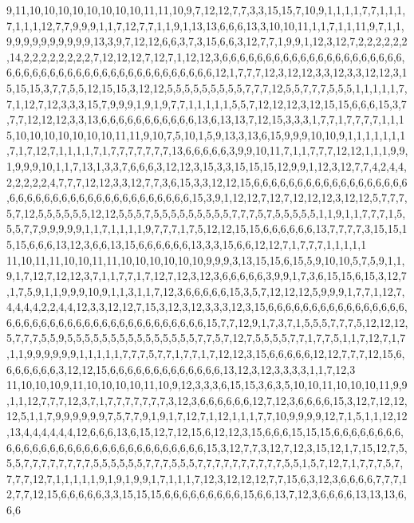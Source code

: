 9,11,10,10,10,10,10,10,10,10,11,11,10,9,7,12,12,7,7,3,3,15,15,7,10,9,1,1,1,1,7,7,1,1,1,7,1,1,1,12,7,7,9,9,9,1,1,7,12,7,7,1,1,9,1,13,13,6,6,6,13,3,10,10,11,1,1,7,1,1,11,9,7,1,1,9,9,9,9,9,9,9,9,9,9,13,3,9,7,12,12,6,6,3,7,3,15,6,6,3,12,7,7,1,9,9,1,12,3,12,7,2,2,2,2,2,2,14,2,2,2,2,2,2,2,2,7,12,12,12,7,12,7,1,12,12,3,6,6,6,6,6,6,6,6,6,6,6,6,6,6,6,6,6,6,6,6,6,6,6,6,6,6,6,6,6,6,6,6,6,6,6,6,6,6,6,6,6,6,6,6,6,12,1,7,7,7,12,3,12,12,3,3,12,3,3,12,12,3,15,15,15,3,7,7,5,5,12,15,15,3,12,12,5,5,5,5,5,5,5,5,5,7,7,7,12,5,5,7,7,7,5,5,5,1,1,1,1,1,7,7,1,12,7,12,3,3,3,15,7,9,9,9,1,9,1,9,7,7,1,1,1,1,1,5,5,7,12,12,12,3,12,15,15,6,6,6,15,3,7,7,7,12,12,12,3,3,13,6,6,6,6,6,6,6,6,6,6,6,13,6,13,13,7,12,15,3,3,3,1,7,7,1,7,7,7,7,1,1,1
5,10,10,10,10,10,10,10,11,11,9,10,7,5,10,1,5,9,13,3,13,6,15,9,9,9,10,10,9,1,1,1,1,1,1,1,7,1,7,12,7,1,1,1,1,7,1,7,7,7,7,7,7,7,13,6,6,6,6,6,3,9,9,10,11,7,1,1,7,7,7,12,12,1,1,1,9,9,1,9,9,9,10,1,1,7,13,1,3,3,7,6,6,6,3,12,12,3,15,3,3,15,15,15,12,9,9,1,12,3,12,7,7,4,2,4,4,2,2,2,2,2,4,7,7,7,12,12,3,3,12,7,7,3,6,15,3,3,12,12,15,6,6,6,6,6,6,6,6,6,6,6,6,6,6,6,6,6,6,6,6,6,6,6,6,6,6,6,6,6,6,6,6,6,6,6,6,6,6,6,15,3,9,1,12,12,7,12,7,12,12,12,3,12,12,5,7,7,7,5,7,12,5,5,5,5,5,5,12,12,5,5,5,7,5,5,5,5,5,5,5,5,5,7,7,7,5,7,5,5,5,5,5,1,1,9,1,1,7,7,7,1,5,5,5,7,7,9,9,9,9,9,1,1,7,1,1,1,1,9,7,7,7,1,7,5,12,12,15,15,6,6,6,6,6,6,13,7,7,7,7,3,15,15,15,15,6,6,6,13,12,3,6,6,13,15,6,6,6,6,6,6,13,3,3,15,6,6,12,12,7,1,7,7,7,1,1,1,1,1
11,10,11,11,10,10,11,11,10,10,10,10,10,10,9,9,9,3,13,15,15,6,15,5,9,10,10,5,7,5,9,1,1,9,1,7,12,7,12,12,3,7,1,1,7,7,1,7,12,7,12,3,12,3,6,6,6,6,6,3,9,9,1,7,3,6,15,15,6,15,3,12,7,1,7,5,9,1,1,9,9,9,10,9,1,1,3,1,1,7,12,3,6,6,6,6,6,15,3,5,7,12,12,12,5,9,9,9,1,7,7,1,12,7,4,4,4,4,2,2,4,4,12,3,3,12,12,7,15,3,12,3,12,3,3,3,12,3,15,6,6,6,6,6,6,6,6,6,6,6,6,6,6,6,6,6,6,6,6,6,6,6,6,6,6,6,6,6,6,6,6,6,6,6,6,6,6,6,15,7,7,12,9,1,7,3,7,1,5,5,5,7,7,7,5,12,12,12,5,7,7,7,5,5,9,5,5,5,5,5,5,5,5,5,5,5,5,5,5,5,7,7,5,7,12,7,5,5,5,5,7,7,1,7,7,5,1,1,7,12,7,1,7,1,1,9,9,9,9,9,9,1,1,1,1,1,7,7,7,5,7,7,1,7,7,1,7,12,12,3,15,6,6,6,6,6,12,12,7,7,7,12,15,6,6,6,6,6,6,6,3,12,12,15,6,6,6,6,6,6,6,6,6,6,6,6,6,13,12,3,12,3,3,3,3,1,1,7,12,3
11,10,10,10,9,11,10,10,10,10,11,10,9,12,3,3,3,6,15,15,3,6,3,5,10,10,11,10,10,10,11,9,9,1,1,12,7,7,7,12,3,7,1,7,7,7,7,7,7,7,3,12,3,6,6,6,6,6,6,12,7,12,3,6,6,6,6,15,3,12,7,12,12,12,5,1,1,7,9,9,9,9,9,9,7,5,7,7,9,1,9,1,7,12,7,1,12,1,1,1,7,7,10,9,9,9,9,12,7,1,5,1,1,12,12,13,4,4,4,4,4,4,12,6,6,6,13,6,15,12,7,12,15,6,12,12,3,15,6,6,6,15,15,15,6,6,6,6,6,6,6,6,6,6,6,6,6,6,6,6,6,6,6,6,6,6,6,6,6,6,6,6,6,6,6,15,3,12,7,7,3,12,7,12,3,15,12,1,7,15,12,7,5,5,5,7,7,7,7,7,7,7,7,5,5,5,5,5,5,7,7,7,5,5,5,7,7,7,7,7,7,7,7,7,7,5,5,1,5,7,12,7,1,7,7,7,5,7,7,7,7,12,7,1,1,1,1,1,9,1,9,1,9,9,1,7,1,1,1,7,12,3,12,12,12,7,7,15,6,3,12,3,6,6,6,6,7,7,7,12,7,7,12,15,6,6,6,6,6,3,3,15,15,15,6,6,6,6,6,6,6,6,6,15,6,6,13,7,12,3,6,6,6,6,13,13,13,6,6,6
